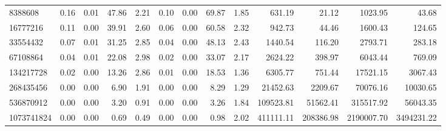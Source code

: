 \begin{tabular}{lrrrrrrrrrrrr}
8388608 & 0.16 & 0.01 & 47.86 & 2.21 & 0.10 & 0.00 & 69.87 & 1.85 & 631.19 & 21.12 & 1023.95 & 43.68 \\
16777216 & 0.11 & 0.00 & 39.91 & 2.60 & 0.06 & 0.00 & 60.58 & 2.32 & 942.73 & 44.46 & 1600.43 & 124.65 \\
33554432 & 0.07 & 0.01 & 31.25 & 2.85 & 0.04 & 0.00 & 48.13 & 2.43 & 1440.54 & 116.20 & 2793.71 & 283.18 \\
67108864 & 0.04 & 0.01 & 22.08 & 2.98 & 0.02 & 0.00 & 33.07 & 2.17 & 2624.22 & 398.97 & 6043.44 & 769.09 \\
134217728 & 0.02 & 0.00 & 13.26 & 2.86 & 0.01 & 0.00 & 18.53 & 1.36 & 6305.77 & 751.44 & 17521.15 & 3067.43 \\
268435456 & 0.00 & 0.00 & 6.90 & 1.91 & 0.00 & 0.00 & 8.29 & 1.29 & 21452.63 & 2209.67 & 70076.16 & 10030.65 \\
536870912 & 0.00 & 0.00 & 3.20 & 0.91 & 0.00 & 0.00 & 3.26 & 1.84 & 109523.81 & 51562.41 & 315517.92 & 56043.35 \\
1073741824 & 0.00 & 0.00 & 0.69 & 0.49 & 0.00 & 0.00 & 0.98 & 2.02 & 411111.11 & 208386.98 & 2190007.70 & 3494231.22 \\
\bottomrule
\end{tabular}
